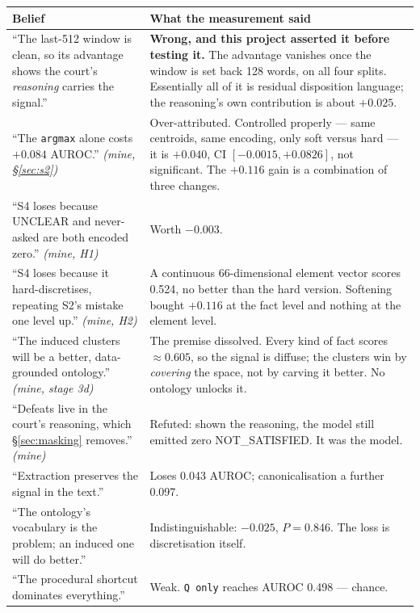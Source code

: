 \documentclass[12pt,a4paper]{article}
\newcommand{\code}[1]{\texttt{\small #1}}
\begin{document}
\begin{center}
{\small
\begin{tabular}{@{}p{5.2cm}p{8.8cm}@{}}
\toprule
\textbf{Belief} & \textbf{What the measurement said} \\
\midrule
``The last-512 window is clean, so its advantage shows the court's \emph{reasoning} carries the
signal.''
 & \textbf{Wrong, and this project asserted it before testing it.} The advantage vanishes once the
   window is set back 128 words, on all four splits. Essentially all of it is residual disposition
   language; the reasoning's own contribution is about $+0.025$. \\
\addlinespace
``The \code{argmax} alone costs $+0.084$ AUROC.'' \emph{(mine, §\ref{sec:s2})}
 & Over-attributed. Controlled properly --- same centroids, same encoding, only soft versus hard ---
   it is $+0.040$, CI $[-0.0015, +0.0826]$, not significant. The $+0.116$ gain is a combination of
   three changes. \\
\addlinespace
``S4 loses because UNCLEAR and never-asked are both encoded zero.'' \emph{(mine, H1)}
 & Worth $-0.003$. \\
\addlinespace
``S4 loses because it hard-discretises, repeating S2's mistake one level up.'' \emph{(mine, H2)}
 & A continuous 66-dimensional element vector scores 0.524, no better than the hard version.
   Softening bought $+0.116$ at the fact level and nothing at the element level. \\
\addlinespace
``The induced clusters will be a better, data-grounded ontology.'' \emph{(mine, stage 3d)}
 & The premise dissolved. Every kind of fact scores $\approx 0.605$, so the signal is diffuse; the
   clusters win by \emph{covering} the space, not by carving it better. No ontology unlocks it. \\
\addlinespace
``Defeats live in the court's reasoning, which §\ref{sec:masking} removes.'' \emph{(mine)}
 & Refuted: shown the reasoning, the model still emitted zero NOT\_SATISFIED. It was the model. \\
\addlinespace
``Extraction preserves the signal in the text.''
 & Loses 0.043 AUROC; canonicalisation a further 0.097. \\
\addlinespace
``The ontology's vocabulary is the problem; an induced one will do better.''
 & Indistinguishable: $-0.025$, $P=0.846$. The loss is discretisation itself. \\
\addlinespace
``The procedural shortcut dominates everything.''
 & Weak. \code{Q only} reaches AUROC 0.498 --- chance. \\

\end{tabular}}
\end{center}
\end{document}

